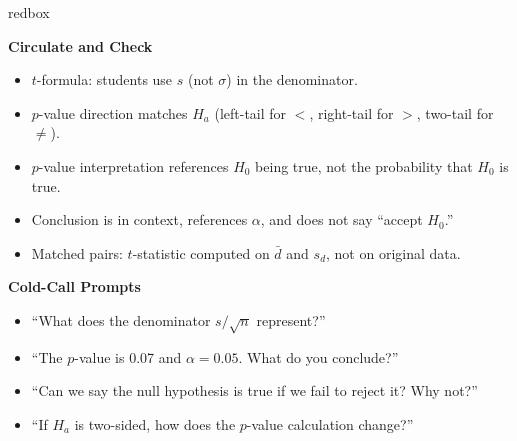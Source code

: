 \documentclass[10pt]{article}
\begin{document}
\begin{skillbox}{redbox}
\begin{minipage}[t]{0.48\linewidth}
    \textbf{Circulate and Check}
    \begin{itemize}
        \item $t$-formula: students use $s$ (not $\sigma$) in the denominator.
        \item $p$-value direction matches $H_a$ (left-tail for $<$, right-tail for $>$,
              two-tail for $\ne$).
        \item $p$-value interpretation references $H_0$ being true, not the probability
              that $H_0$ is true.
        \item Conclusion is in context, references $\alpha$, and does not say ``accept $H_0$.''
        \item Matched pairs: $t$-statistic computed on $\bar d$ and $s_d$, not on original data.
    \end{itemize}
\end{minipage}
\hfill
\begin{minipage}[t]{0.48\linewidth}
    \textbf{Cold-Call Prompts}
    \begin{itemize}
        \item ``What does the denominator $s/\sqrt{n}$ represent?''
        \item ``The $p$-value is 0.07 and $\alpha = 0.05$. What do you conclude?''
        \item ``Can we say the null hypothesis is true if we fail to reject it? Why not?''
        \item ``If $H_a$ is two-sided, how does the $p$-value calculation change?''
    \end{itemize}
\end{minipage}
\end{skillbox}
\end{document}
